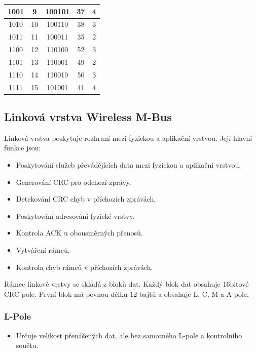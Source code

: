 \begin{table}[!ht]
{\begin{tabular}{|c|c|c|c|c|}
1001             & 9                  & 100101              & 37                 & 4                          \\ \hline
1010             & 10                 & 100110              & 38                 & 3                          \\ \hline
1011             & 11                 & 100011              & 35                 & 2                          \\ \hline
1100             & 12                 & 110100              & 52                 & 3                          \\ \hline
1101             & 13                 & 110001              & 49                 & 2                          \\ \hline
1110             & 14                 & 110010              & 50                 & 3                          \\ \hline
1111             & 15                 & 101001              & 41                 & 4                          \\ \hline \hline
\end{tabular}}
\end{table}

\subsection{Linková vrstva Wireless M-Bus}

Linková vrstva poskytuje rozhraní mezi fyzickou a aplikační vrstvou. Její hlavní funkce jsou:
\begin{itemize}
	\item Poskytování služeb převádějících data mezi fyzickou a aplikační vrstvou.
	\item Generování CRC pro odchozí zprávy.
	\item Detekování CRC chyb v příchozích zprávách.
	\item Poskytování adresování fyzické vrstvy.
	\item Kontrola ACK u obousměrných přenosů.
	\item Vytváření rámců.
	\item Kontrola chyb rámců v příchozích zprávách.
\end{itemize}

Rámec linkové vrstvy se skládá z bloků dat. Každý blok dat obsahuje 16bitové CRC pole.  První blok má pevnou délku 12 bajtů a obsahuje L, C, M a A pole.

\subsubsection{L-Pole}
\begin{itemize}
	\item Určuje velikost přenášených dat, ale bez samotného L-pole a kontrolního součtu.	
\end{itemize}

